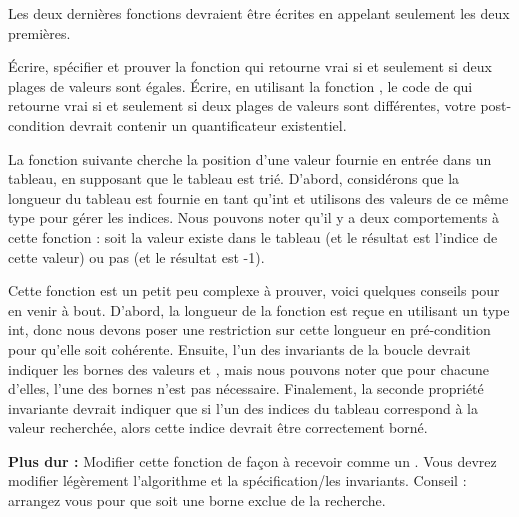 Les deux dernières fonctions devraient être écrites en appelant seulement les deux
premières.





Écrire, spécifier et prouver la fonction  qui retourne vrai
si et seulement si deux plages de valeurs sont égales. Écrire, en utilisant la
fonction , le code de  qui retourne vrai
si et seulement si deux plages de valeurs sont différentes, votre post-condition
devrait contenir un quantificateur existentiel.





\label{l4:statements-loops-ex-bsearch}


La fonction suivante cherche la position d'une valeur fournie en entrée dans
un tableau, en supposant que le tableau est trié. D'abord, considérons que la
longueur du tableau est fournie en tant qu'int et utilisons des valeurs de ce
même type pour gérer les indices. Nous pouvons noter qu'il y a deux comportements
à cette fonction : soit la valeur existe dans le tableau (et le résultat est 
l'indice de cette valeur) ou pas (et le résultat est -1).
 
 


Cette fonction est un petit peu complexe à prouver, voici quelques conseils
pour en venir à bout. D'abord, la longueur de la fonction est reçue en utilisant
un type int, donc nous devons poser une restriction sur cette longueur en 
pré-condition pour qu'elle soit cohérente. Ensuite, l'un des invariants de la
boucle devrait indiquer les bornes des valeurs  et 
, mais nous pouvons noter que pour chacune d'elles, l'une des
bornes n'est pas nécessaire. Finalement, la seconde propriété invariante 
devrait indiquer que si l'un des indices du tableau correspond à la valeur
recherchée, alors cette indice devrait être correctement borné.

\textbf{Plus dur :} Modifier cette fonction de façon à recevoir 
comme un . Vous devrez modifier légèrement l'algorithme et 
la spécification/les invariants. Conseil : arrangez vous pour que 
soit une borne exclue de la recherche.




